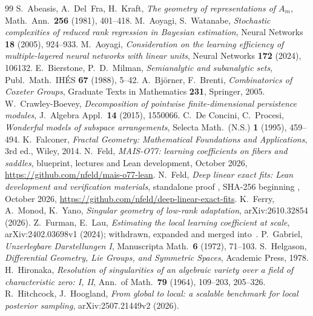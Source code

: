 \documentclass[11pt,a4paper]{article}
\theoremstyle{definition}
\theoremstyle{remark}
\numberwithin{equation}{section}
\begin{document}
\begin{thebibliography}{99}
 S.~Abeasis, A.~Del~Fra, H.~Kraft, \emph{The geometry of representations of $A_m$}, Math.\ Ann.\ \textbf{256} (1981), 401--418.
 M.~Aoyagi, S.~Watanabe, \emph{Stochastic complexities of reduced rank regression in Bayesian estimation}, Neural Networks \textbf{18} (2005), 924--933.
 M.~Aoyagi, \emph{Consideration on the learning efficiency of multiple-layered neural networks with linear units}, Neural Networks \textbf{172} (2024), 106132.
 E.~Bierstone, P.~D.~Milman, \emph{Semianalytic and subanalytic sets}, Publ.\ Math.\ IHÉS \textbf{67} (1988), 5--42.
 A.~Björner, F.~Brenti, \emph{Combinatorics of Coxeter Groups}, Graduate Texts in Mathematics \textbf{231}, Springer, 2005.
 W.~Crawley-Boevey, \emph{Decomposition of pointwise finite-dimensional persistence modules}, J.\ Algebra Appl.\ \textbf{14} (2015), 1550066.
 C.~De Concini, C.~Procesi, \emph{Wonderful models of subspace arrangements}, Selecta Math.\ (N.S.) \textbf{1} (1995), 459--494.
 K.~Falconer, \emph{Fractal Geometry: Mathematical Foundations and Applications}, 3rd ed., Wiley, 2014.
 N.~Feld, \emph{MAIS-O77: learning coefficients on fibers and saddles}, blueprint, lectures and Lean development, October 2026, \url{https://github.com/nfeld/mais-o77-lean}.
 N.~Feld, \emph{Deep linear exact fits: Lean development and verification materials}, standalone proof , SHA-256 beginning , October 2026, \url{https://github.com/nfeld/deep-linear-exact-fits}.
 K.~Ferry, A.~Monod, K.~Yano, \emph{Singular geometry of low-rank adaptation}, arXiv:2610.32854 (2026).
 Z.~Furman, E.~Lau, \emph{Estimating the local learning coefficient at scale}, arXiv:2402.03698v1 (2024); withdrawn, expanded and merged into~\cite{lau-llc}.
 P.~Gabriel, \emph{Unzerlegbare Darstellungen I}, Manuscripta Math.\ \textbf{6} (1972), 71--103.
 S.~Helgason, \emph{Differential Geometry, Lie Groups, and Symmetric Spaces}, Academic Press, 1978.
 H.~Hironaka, \emph{Resolution of singularities of an algebraic variety over a field of characteristic zero: I, II}, Ann.\ of Math.\ \textbf{79} (1964), 109--203, 205--326.
 R.~Hitchcock, J.~Hoogland, \emph{From global to local: a scalable benchmark for local posterior sampling}, arXiv:2507.21449v2 (2026).

\end{thebibliography}
\end{document}
